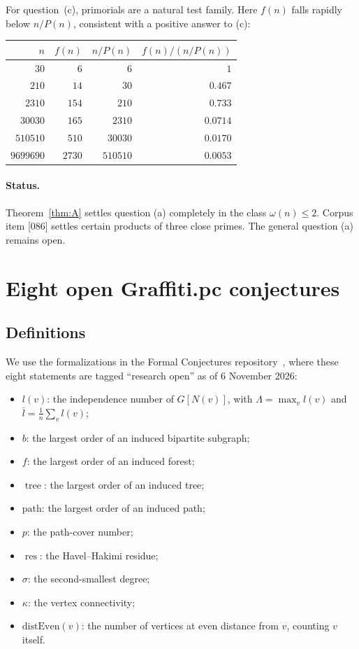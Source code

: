 \documentclass[11pt,a4paper]{article}
\theoremstyle{definition}
\newcommand{\res}{\operatorname{res}}
\newcommand{\tr}{\operatorname{tree}}
\begin{document}
For question~(c), primorials are a natural test family. Here $f(n)$ falls rapidly below
$n/P(n)$, consistent with a positive answer to (c):

\begin{center}
\begin{tabular}{rrrr}
\toprule
$n$ & $f(n)$ & $n/P(n)$ & $f(n)/(n/P(n))$\\
\midrule
$30$ & $6$ & $6$ & $1$\\
$210$ & $14$ & $30$ & $0.467$\\
$2310$ & $154$ & $210$ & $0.733$\\
$30030$ & $165$ & $2310$ & $0.0714$\\
$510510$ & $510$ & $30030$ & $0.0170$\\
$9699690$ & $2730$ & $510510$ & $0.0053$\\
\bottomrule
\end{tabular}
\end{center}

\paragraph{Status.} Theorem~\ref{thm:A} settles question (a) completely in the class
$\omega(n)\le2$. Corpus item [086] settles certain products of three close primes. The
general question (a) remains open.

\section{Eight open Graffiti.pc conjectures}

\subsection{Definitions}
We use the formalizations in the Formal Conjectures repository~\cite{FC}, where these eight
statements are tagged ``research open'' as of 6 November 2026:
\begin{itemize}
\item $l(v)$: the independence number of $G[N(v)]$, with $\Lambda=\max_vl(v)$ and
  $\bar l=\frac1n\sum_vl(v)$;
\item $b$: the largest order of an induced bipartite subgraph;
\item $f$: the largest order of an induced forest;
\item $\tr$: the largest order of an induced tree;
\item $\mathrm{path}$: the largest order of an induced path;
\item $p$: the path-cover number;
\item $\res$: the Havel--Hakimi residue;
\item $\sigma$: the second-smallest degree;
\item $\kappa$: the vertex connectivity;
\item $\mathrm{distEven}(v)$: the number of vertices at even distance from $v$, counting
  $v$ itself.
\end{itemize}
\end{document}
